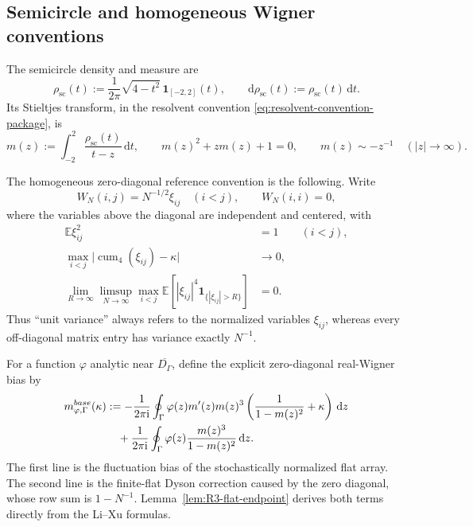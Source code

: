 \documentclass[10pt,a4paper]{amsart}
\newcommand{\E}{\mathbb E}
\newcommand{\cum}{\operatorname{cum}}
\newcommand{\scal}{\mathrm{sc}}
\newcommand{\ii}{\mathrm i}
\newcommand{\dd}{\mathrm d}
\newcommand{\one}{\mathbf 1}
\newcommand{\abs}[1]{\lvert #1\rvert}
\begin{document}
\subsection{Semicircle and homogeneous Wigner conventions}

The semicircle density and measure are
\begin{equation}\label{eq:semicircle-density}
 \rho_{\scal}(t):=\frac{1}{2\pi}\sqrt{4-t^2}\,
 \one_{[-2,2]}(t),
 \qquad
 \dd\rho_{\scal}(t):=\rho_{\scal}(t)\,\dd t.
\end{equation}
Its Stieltjes transform, in the resolvent convention
\eqref{eq:resolvent-convention-package}, is
\begin{equation}\label{eq:semicircle-m-package}
 m(z):=\int_{-2}^2\frac{\rho_{\scal}(t)}{t-z}\,\dd t,
 \qquad
 m(z)^2+zm(z)+1=0,
 \qquad
 m(z)\sim-z^{-1}\quad(|z|\to\infty).
\end{equation}

The homogeneous zero-diagonal reference convention is the following.  Write
\begin{equation}\label{eq:base-Wigner-normalization}
 W_N(i,j)=N^{-1/2}\xi_{ij}\quad(i<j),
 \qquad W_N(i,i)=0,
\end{equation}
where the variables above the diagonal are independent and centered, with
\begin{align}
 \E\xi_{ij}^2&=1\qquad (i<j),
 \label{eq:base-Wigner-variance}\\
 \max_{i<j}\abs{\cum_4(\xi_{ij})-\kappa}&\longrightarrow0,
 \label{eq:base-Wigner-kappa}\\
 \lim_{R\to\infty}\limsup_{N\to\infty}\max_{i<j}
 \E\!\left[|\xi_{ij}|^4\one_{\{|\xi_{ij}|>R\}}\right]&=0.
 \label{eq:base-Wigner-Lindeberg}
\end{align}
Thus ``unit variance'' always refers to the normalized variables \(\xi_{ij}\),
whereas every off-diagonal matrix entry has variance exactly \(N^{-1}\).

For a function \(\varphi\) analytic near \(\overline{D_\Gamma}\), define the
explicit zero-diagonal real-Wigner bias by
\begin{align}
 m_{\varphi,\Gamma}^{\rm base}(\kappa)
 &:=-\frac{1}{2\pi\ii}\oint_\Gamma
 \varphi(z)m'(z)m(z)^3
 \left(\frac{1}{1-m(z)^2}+\kappa\right)\,\dd z
 \notag\\
 &\quad+\frac{1}{2\pi\ii}\oint_\Gamma
 \varphi(z)\frac{m(z)^3}{1-m(z)^2}\,\dd z.
 \label{eq:base-mean-definition}
\end{align}
The first line is the fluctuation bias of the stochastically normalized flat
array.  The second line is the finite-flat Dyson correction caused by the zero
diagonal, whose row sum is \(1-N^{-1}\).  Lemma~\ref{lem:R3-flat-endpoint}
derives both terms directly from the Li--Xu formulas.
\end{document}
